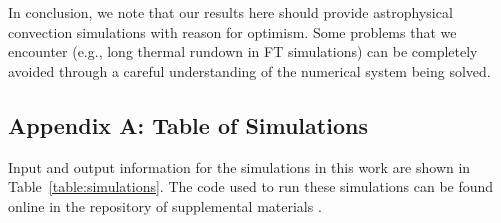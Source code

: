 In conclusion, we note that our results here should provide astrophysical convection simulations with reason for optimism.
Some problems that we encounter (e.g., long thermal rundown in FT simulations) can be completely avoided through a careful understanding of the numerical system being solved.

\subsection{Appendix A: Table of Simulations}
\label{app:table}
Input and output information for the simulations in this work are shown in Table~\ref{table:simulations}.
The code used to run these simulations can be found online in the repository of supplemental materials \citep{anders&all2020a_supp}.




